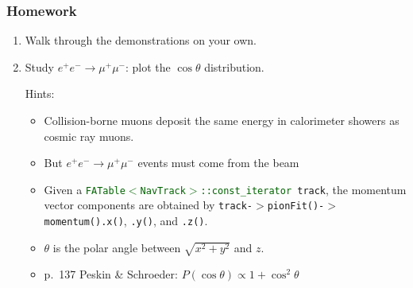 \documentclass[12pt,compress]{beamer}
\begin{document}
\begin{frame}
\frametitle{Homework}

\begin{enumerate}\setlength{\itemsep}{0.3 cm}
\item Walk through the demonstrations on your own.
\item Study $e^+e^- \to \mu^+\mu^-$: plot the $\cos\theta$ distribution.

\vspace{0.2 cm}
Hints:\setlength{\itemsep}{0.4 cm}
\begin{itemize}\setlength{\itemsep}{0.1 cm}
\item Collision-borne muons deposit the same energy in calorimeter showers as cosmic ray muons.
\item But $e^+e^- \to \mu^+\mu^-$ events must come from the beam
\item Given a {\tt \scriptsize \textcolor{darkgreen}{FATable$<$NavTrack$>$::const\_iterator} track}, the momentum
vector components are obtained by {\tt \scriptsize track-$>$pionFit()-$>$momentum().x()}, {\tt \scriptsize .y()},
and {\tt \scriptsize .z()}.
\item $\theta$ is the polar angle between $\sqrt{x^2 + y^2}$ and $z$.
\item p.\ 137 Peskin \& Schroeder: $P(\cos\theta) \propto 1 + \cos^2\theta$
\end{itemize}

\end{enumerate}

\end{frame}
\end{document}
